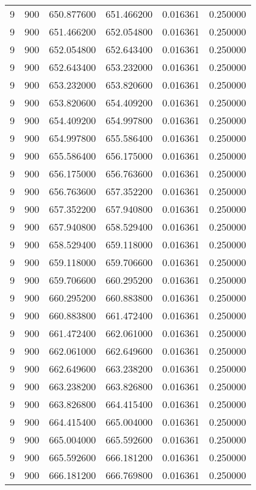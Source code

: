\begin{longtable}{rrrrrr}
9 & 900 & 650.877600 & 651.466200 & 0.016361 & 0.250000 \\
9 & 900 & 651.466200 & 652.054800 & 0.016361 & 0.250000 \\
9 & 900 & 652.054800 & 652.643400 & 0.016361 & 0.250000 \\
9 & 900 & 652.643400 & 653.232000 & 0.016361 & 0.250000 \\
9 & 900 & 653.232000 & 653.820600 & 0.016361 & 0.250000 \\
9 & 900 & 653.820600 & 654.409200 & 0.016361 & 0.250000 \\
9 & 900 & 654.409200 & 654.997800 & 0.016361 & 0.250000 \\
9 & 900 & 654.997800 & 655.586400 & 0.016361 & 0.250000 \\
9 & 900 & 655.586400 & 656.175000 & 0.016361 & 0.250000 \\
9 & 900 & 656.175000 & 656.763600 & 0.016361 & 0.250000 \\
9 & 900 & 656.763600 & 657.352200 & 0.016361 & 0.250000 \\
9 & 900 & 657.352200 & 657.940800 & 0.016361 & 0.250000 \\
9 & 900 & 657.940800 & 658.529400 & 0.016361 & 0.250000 \\
9 & 900 & 658.529400 & 659.118000 & 0.016361 & 0.250000 \\
9 & 900 & 659.118000 & 659.706600 & 0.016361 & 0.250000 \\
9 & 900 & 659.706600 & 660.295200 & 0.016361 & 0.250000 \\
9 & 900 & 660.295200 & 660.883800 & 0.016361 & 0.250000 \\
9 & 900 & 660.883800 & 661.472400 & 0.016361 & 0.250000 \\
9 & 900 & 661.472400 & 662.061000 & 0.016361 & 0.250000 \\
9 & 900 & 662.061000 & 662.649600 & 0.016361 & 0.250000 \\
9 & 900 & 662.649600 & 663.238200 & 0.016361 & 0.250000 \\
9 & 900 & 663.238200 & 663.826800 & 0.016361 & 0.250000 \\
9 & 900 & 663.826800 & 664.415400 & 0.016361 & 0.250000 \\
9 & 900 & 664.415400 & 665.004000 & 0.016361 & 0.250000 \\
9 & 900 & 665.004000 & 665.592600 & 0.016361 & 0.250000 \\
9 & 900 & 665.592600 & 666.181200 & 0.016361 & 0.250000 \\
9 & 900 & 666.181200 & 666.769800 & 0.016361 & 0.250000 \\

\end{longtable}
